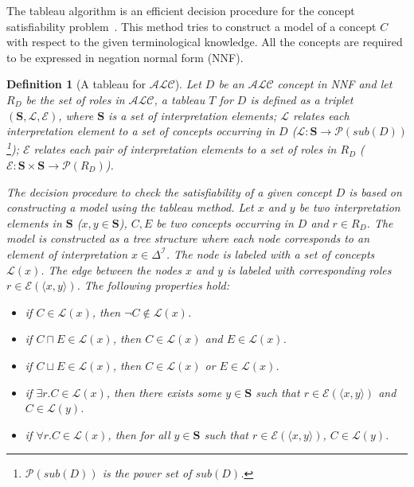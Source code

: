\documentclass{article}
\newtheorem{mydef}{Definition}
\begin{document}
The tableau algorithm is an efficient decision procedure for the concept satisfiability problem~\cite{baader2001overview,gore2007exptime,nguyen2009efficient}.
This method tries to construct a model of a concept $C$ with respect to the given terminological knowledge. 
All the concepts are required to be expressed in negation normal form (NNF). 

\begin{mydef}[A tableau for $\mathcal{ALC}$] \label{def:tableauALC}
Let $D$ be an $\mathcal{ALC}$ concept in NNF and let $R_D$ be the set of roles in $\mathcal{ALC}$, a tableau $T$ for $D$ is defined as a triplet $(\mathbf{S},\mathcal{L}, \mathcal{E})$, 
where $\mathbf{S}$ is a set of interpretation elements;
$\mathcal{L}$ relates each interpretation element to a set of concepts occurring in $D$ ($\mathcal{L}:\mathbf{S}\rightarrow\mathcal{P}(sub(D))$
\footnote{$\mathcal{P}(sub(D))$ is the power set of $sub(D)$.});  
$\mathcal{E}$ relates each pair of interpretation elements to a set of roles in $R_D$  ($\mathcal{E}:\mathbf{S}\times\mathbf{S}\rightarrow \mathcal{P}(R_D)$). 

The decision procedure to check the satisfiability of a given concept $D$ is based on constructing a model using the tableau method. 
Let $x$ and $y$ be two interpretation elements in $\mathbf{S}$ ($x,y\in \mathbf{S}$), $C,E$ be two concepts occurring in $D$ and $r\in R_D$.
The model is constructed as a tree structure where each node corresponds to an element of interpretation $x\in \Delta^\mathcal{I}$.
The node is labeled with a set of concepts $\mathcal{L}(x)$.
The edge between the nodes $x$ and $y$ is labeled with corresponding roles $r\in\mathcal{E}(\langle x,y \rangle)$.
The following properties hold:
\begin{itemize}
\item if $C\in \mathcal{L}(x)$, then $\neg C\notin\mathcal{L}(x)$.
\item if $C\sqcap E\in \mathcal{L}(x)$, then $ C\in\mathcal{L}(x)$ and $ E\in\mathcal{L}(x)$.
\item if $C\sqcup E\in \mathcal{L}(x)$, then $ C\in\mathcal{L}(x)$ or $ E\in\mathcal{L}(x)$.
\item if $\exists r.C\in \mathcal{L}(x)$, then there exists some $y\in \mathbf{S}$  such that $r \in \mathcal{E}(\langle x,y\rangle)$ and $C\in\mathcal{L}(y)$.
\item if $\forall r.C\in \mathcal{L}(x)$, then for all $y \in \mathbf{S}$ such that $r \in \mathcal{E}(\langle x,y\rangle)$, $C\in\mathcal{L}(y)$.
\end{itemize}
\end{mydef}
\end{document}
